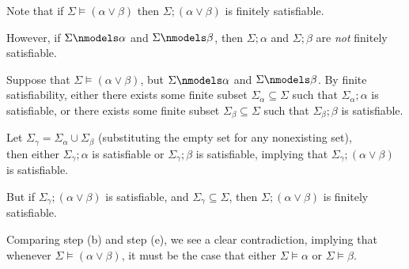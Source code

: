 \begin{problem}
\begin{enumalph}
\begin{Answer}
        \begin{enumroman}
          \item Note that if $\Sigma \models (\alpha \lor \beta)$ then $\Sigma ; (\alpha \lor \beta)$ is finitely satisfiable.~\label{cor:5.4}
          \item However, if $\Sigma \nmodels \alpha$ and $\Sigma \nmodels \beta$,
            then $\Sigma ; \alpha$ and $\Sigma ; \beta$ are \emph{not} finitely satisfiable.~\label{cor:5.5}
          \item Suppose that $\Sigma \models (\alpha \lor \beta)$,
            but $\Sigma \nmodels \alpha$ and $\Sigma \nmodels \beta$.
            By finite satisfiability,
            either there exists some finite subset
            $\Sigma_\alpha \subseteq \Sigma$ such that $\Sigma_\alpha ; \alpha$ is satisfiable,
            or there exists some finite subset $\Sigma_\beta \subseteq \Sigma$
            such that $\Sigma_\beta ; \beta$ is satisfiable.
          \item Let $\Sigma_\gamma = \Sigma_\alpha \cup \Sigma_\beta$
            (substituting the empty set for any nonexisting set),\\
            then either $\Sigma_\gamma ; \alpha$ is satisfiable or $\Sigma_\gamma ; \beta$ is satisfiable,
            implying that $\Sigma_\gamma ; (\alpha \lor \beta)$ is satisfiable.
          \item But if $\Sigma_\gamma ; (\alpha \lor \beta)$ is satisfiable,
            and $\Sigma_\gamma \subseteq \Sigma$, then $\Sigma ; (\alpha \lor \beta)$ is finitely satisfiable.~\label{cor:5.6}
          \item Comparing step (b) and step (e), we see a clear contradiction,
            implying that whenever $\Sigma \models (\alpha \lor \beta)$,
            it must be the case that either $\Sigma \models \alpha$ or $\Sigma \models \beta$.
        \end{enumroman}
      \end{Answer}
  \end{enumalph}
\end{problem}

